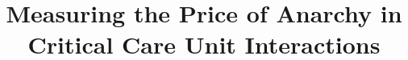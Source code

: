 \documentclass{beamer}
\title{Measuring the Price of Anarchy in Critical Care Unit Interactions}
\begin{document}
\frame{\maketitle}
\end{document}
